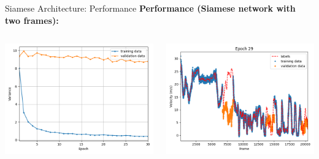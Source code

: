 \begin{frame}{Siamese Architecture: Performance}
	\textbf{Performance (Siamese network with two frames):}
	\begin{columns}[c]
		\begin{column}{0.5\textwidth}
			\includegraphics[width=\textwidth]{imgs/siamese_frames_training.png}
		\end{column}
		\begin{column}{0.5\textwidth}
			\includegraphics[width=\textwidth]{imgs/siamese_frames_performance2.png}
		\end{column}
	\end{columns}
\end{frame}

